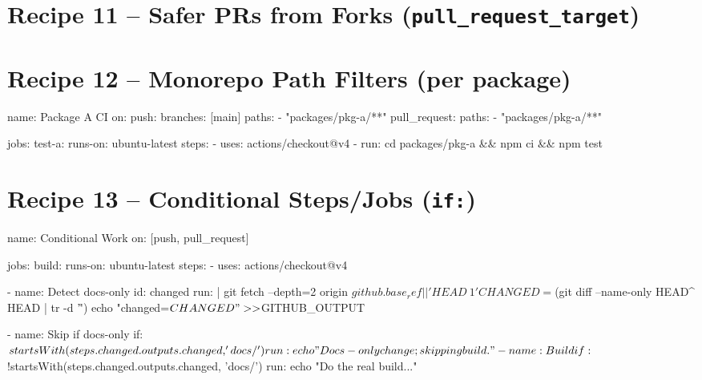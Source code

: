 \documentclass[11pt]{article}
\begin{document}
\section{Recipe 11 – Safer PRs from Forks (\texttt{pull\_request\_target})}
\begin{listing}[H]
\caption{Guarded use of \texttt{pull\_request\_target}}
\end{listing}

\newpage
\section{Recipe 12 – Monorepo Path Filters (per package)}
\begin{listing}[H]
\caption{Monorepo CI per package directory}
\begin{yamlcode}
name: Package A CI
on:
  push:
    branches: [main]
    paths:
      - "packages/pkg-a/**"
  pull_request:
    paths:
      - "packages/pkg-a/**"

jobs:
  test-a:
    runs-on: ubuntu-latest
    steps:
      - uses: actions/checkout@v4
      - run: cd packages/pkg-a && npm ci && npm test
\end{yamlcode}
\end{listing}

\newpage
\section{Recipe 13 – Conditional Steps/Jobs (\texttt{if:})}
\begin{listing}[H]
\caption{Conditionally skip when only docs changed}
\begin{yamlcode}
name: Conditional Work
on: [push, pull_request]

jobs:
  build:
    runs-on: ubuntu-latest
    steps:
      - uses: actions/checkout@v4

      - name: Detect docs-only
        id: changed
        run: |
          git fetch --depth=2 origin ${{ github.base_ref || 'HEAD~1' }}
          CHANGED=$(git diff --name-only HEAD^ HEAD | tr -d '\r')
          echo "changed=$CHANGED" >> $GITHUB_OUTPUT

      - name: Skip if docs-only
        if: ${{ startsWith(steps.changed.outputs.changed, 'docs/') }}
        run: echo "Docs-only change; skipping build."

      - name: Build
        if: ${{ !startsWith(steps.changed.outputs.changed, 'docs/') }}
        run: echo "Do the real build..."
\end{yamlcode}
\end{listing}
\end{document}
